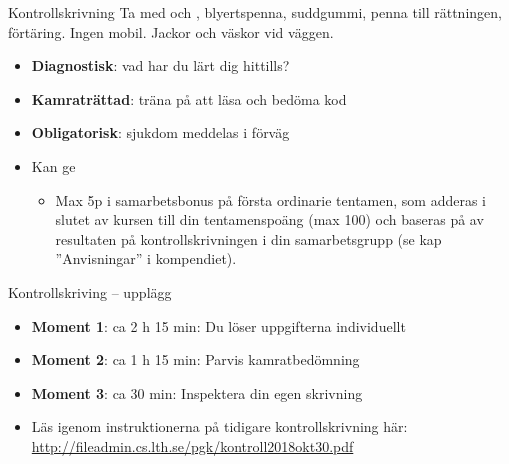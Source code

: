 


\begin{Slide}{Kontrollskrivning}
Ta med  och , blyertspenna, suddgummi,  penna till rättningen, förtäring. Ingen mobil. Jackor och väskor vid väggen.
\begin{itemize}
  \item \textbf{Diagnostisk}: vad har du lärt dig hittills?
  \item \textbf{Kamraträttad}: träna på att läsa och bedöma kod
  \item \textbf{Obligatorisk}: sjukdom  meddelas i förväg
  \item Kan ge  
  \begin{itemize}
    \item[] Max 5p i samarbetsbonus på första ordinarie tentamen, som adderas i slutet av kursen till din tentamenspoäng (max 100) och baseras på  av resultaten på kontrollskrivningen i din samarbetsgrupp (se kap ''Anvisningar'' i kompendiet).
  \end{itemize}
\end{itemize}
\end{Slide}

\begin{Slide}{Kontrollskriving -- upplägg}\SlideFontSmall
\begin{itemize}
  \item \textbf{Moment 1}: ca 2 h 15 min: Du löser uppgifterna individuellt
  \item \textbf{Moment 2}: ca 1 h 15 min: Parvis kamratbedömning
  \item \textbf{Moment 3}: ca 30 min: Inspektera din egen skrivning

\item Läs  igenom instruktionerna på tidigare kontrollskrivning här: 
\url{http://fileadmin.cs.lth.se/pgk/kontroll2018okt30.pdf}

\end{itemize}


\end{Slide}

